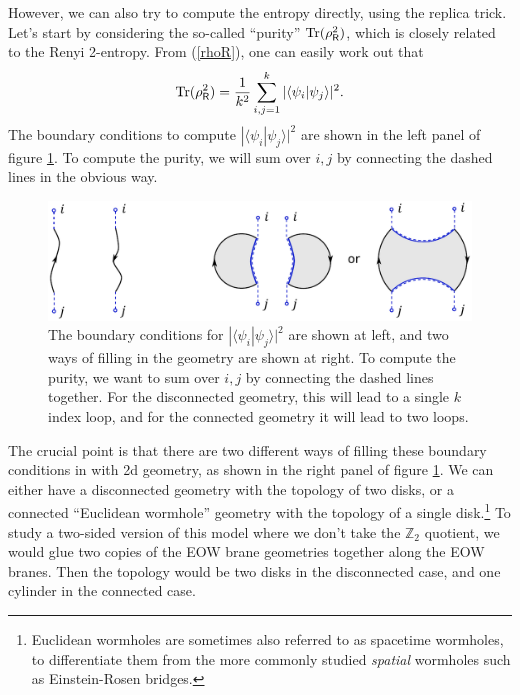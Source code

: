 \documentclass[12pt]{article}
\newcommand{\be}{\begin{equation}}
\newcommand{\ee}{\end{equation}}
\numberwithin{equation}{section}
\def\tr{\text{Tr}}
\begin{document}
However, we can also try to compute the entropy directly, using the replica trick. Let's start by considering the so-called ``purity'' $\tr(\rho_{\sf{R}}^2)$, which is closely related to the Renyi 2-entropy. From (\ref{rhoR}), one can easily work out that
\be
\tr(\rho_{\sf{R}}^2) = \frac{1}{k^2}\sum_{i,j = 1}^k|\langle \psi_i|\psi_j\rangle|^2.\label{purityFormula}
\ee
The boundary conditions to compute $|\langle \psi_i|\psi_j\rangle|^2$ are shown in the left panel of figure \ref{fig1f}. To compute the purity, we will sum over $i,j$ by connecting the dashed lines in the obvious way.

\begin{figure}[t]
\begin{center}
\includegraphics[scale = .75]{images/1f.pdf}
\caption{{\small The boundary conditions for $|\langle \psi_i|\psi_j\rangle|^2$ are shown at left, and two ways of filling in the geometry are shown at right. To compute the purity, we want to sum over $i,j$ by connecting the dashed lines together. For the disconnected geometry, this will lead to a single $k$ index loop, and for the connected geometry it will lead to two loops.}}\label{fig1f}
\end{center}
\end{figure}
The crucial point is that there are two different ways of filling these boundary conditions in with 2d geometry, as shown in the right panel of figure \ref{fig1f}. We can either have a disconnected geometry with the topology of two disks, or a connected ``Euclidean wormhole'' geometry with the topology of a single disk.\footnote{Euclidean wormholes are sometimes also referred to as spacetime wormholes, to differentiate them from the more commonly studied {\it spatial} wormholes such as Einstein-Rosen bridges.} To study a two-sided version of this model where we don't take the $\mathbb{Z}_2$ quotient, we would glue two copies of the EOW brane geometries together along the EOW branes. Then the topology would be two disks in the disconnected case, and one cylinder in the connected case.

\end{document}
